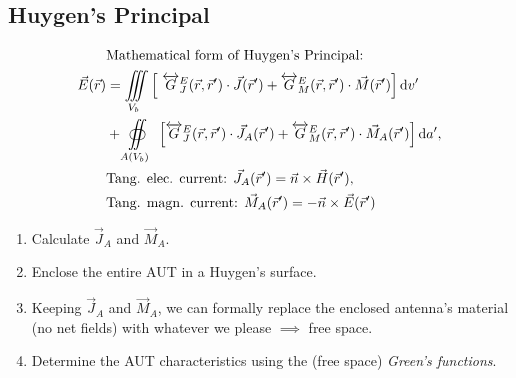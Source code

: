 \subsection{Huygen's Principal}
\begin{align*}
    &\text{Mathematical form of Huygen's Principal:}\\
    \vec{E}(\vec{r})
    &= \iiint\limits_{V_b} \left[\
    \overleftrightarrow{G}^E_J(\vec{r},\vec{r}^\prime)\cdot\vec{J}(\vec{r}^\prime)
    + \overleftrightarrow{G}^E_M(\vec{r},\vec{r}^\prime)\cdot\vec{M}(\vec{r}^\prime) \right] \mathrm{d}v^\prime\\
    &+ \oiint\limits_{A(V_b)}\
    \left[ \overleftrightarrow{G}^E_J(\vec{r},\vec{r}^\prime)\cdot\vec{J}_A(\vec{r}^\prime)
    + \overleftrightarrow{G}^E_M(\vec{r},\vec{r}^\prime)\cdot\vec{M}_A(\vec{r}^\prime) \right] \mathrm{d}a^\prime,\\
    &\text{Tang. elec. current: }\vec{J}_A(\vec{r}^\prime) = \vec{n} \times \vec{H}(\vec{r}^\prime),\\
    &\text{Tang. magn. current: }\vec{M}_A(\vec{r}^\prime) = -\vec{n} \times \vec{E}(\vec{r}^\prime)
\end{align*}
\begin{enumerate}
    \itemsep-1pt
    \item Calculate $\vec{J}_A$ and $\vec{M}_A$.
    \item Enclose the entire AUT in a Huygen's surface.
    \item Keeping $\vec{J}_A$ and $\vec{M}_A$, we can formally replace the enclosed antenna's material (no net fields) with whatever we please $\implies$ free space.
    \item Determine the AUT characteristics using the (free space) \textit{Green's functions}.
\end{enumerate}

